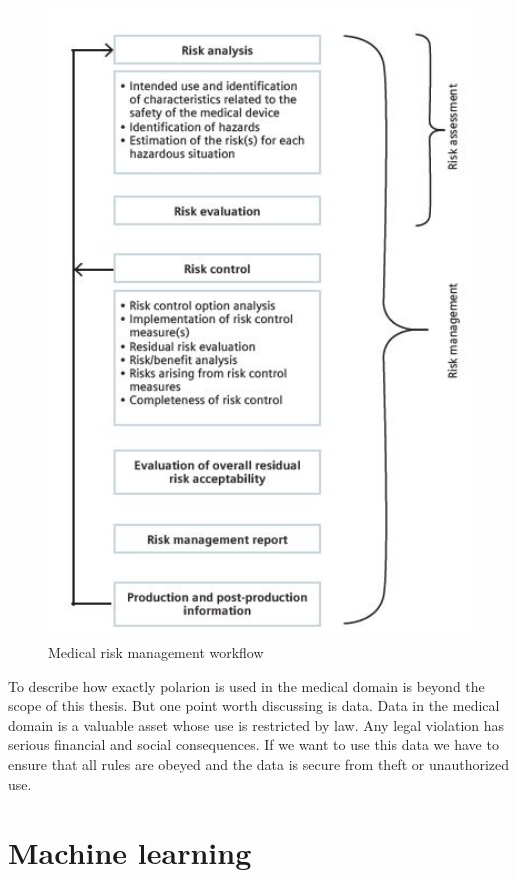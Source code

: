 \documentclass[thesis=M,english]{FITthesis}[2012/06/26]
\begin{document}
\begin{figure}[h!]\centering
	\includegraphics[width=1\textwidth]{pictures/medical_standard}
	\caption{Medical risk management workflow \cite{polarion_alm}}\label{fig:medical_standard}
\end{figure}

To describe how exactly \acrshort{polarion} is used in the medical domain is beyond the scope of this thesis. But one point worth discussing is data. Data in the medical domain is a valuable asset whose use is restricted by law. Any legal violation has serious financial and social consequences. If we want to use this data we have to ensure that all rules are obeyed and the data is secure from theft or unauthorized use.

\chapter{Machine learning}
\end{document}
